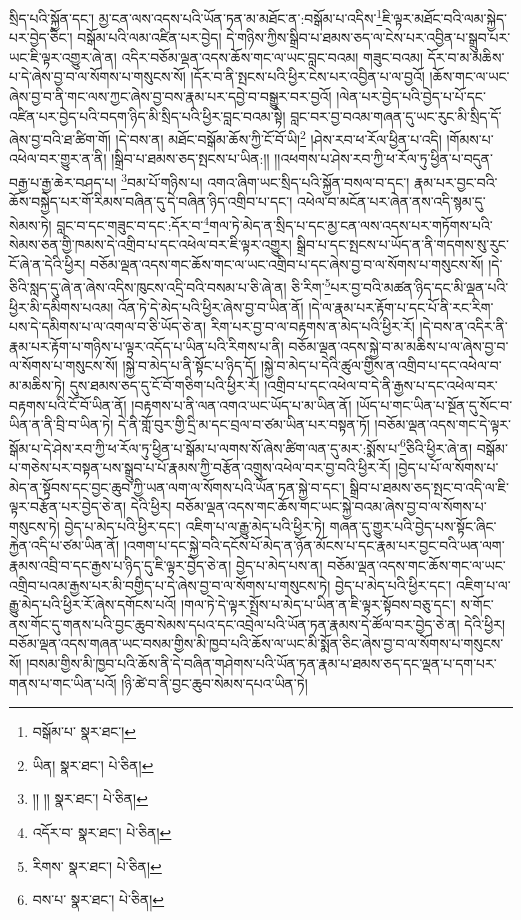 སྲིད་པའི་སྐྱོན་དང་། མྱ་ངན་ལས་འདས་པའི་ཡོན་ཏན་མ་མཐོང་ན་:བསྒོམ་པ་འདིས་\footnote{བསྒོམ་པ་  སྣར་ཐང་། }ཇི་ལྟར་མཐོང་བའི་ལམ་སྐྱེད་པར་བྱེད་ཅིང་། བསྒོམ་པའི་ལམ་འཛིན་པར་བྱེད། དེ་གཉིས་ཀྱིས་སྒྲིབ་པ་ཐམས་ཅད་ལ་ངེས་པར་འབྱིན་པ་སྒྲུབ་པར་ཡང་ཇི་ལྟར་འགྱུར་ཞེ་ན། འདིར་བཅོམ་ལྡན་འདས་ཆོས་གང་ལ་ཡང་བླང་བའམ། གཟུང་བའམ། དོར་བ་མ་མཆིས་པ་དེ་ཞེས་བྱ་བ་ལ་སོགས་པ་གསུངས་སོ། །དོར་བ་ནི་སྤངས་པའི་ཕྱིར་ངེས་པར་འབྱིན་པ་ལ་བྱའོ། །ཆོས་གང་ལ་ཡང་ཞེས་བྱ་བ་ནི་གང་ལས་ཀྱང་ཞེས་བྱ་བས་རྣམ་པར་དབྱེ་བ་བསྒྱུར་བར་བྱའོ། །ལེན་པར་བྱེད་པའི་བྱེད་པ་པོ་དང་འཛིན་པར་བྱེད་པའི་བདག་ཉིད་མི་སྲིད་པའི་ཕྱིར་བླང་བའམ་སྟེ། བླང་བར་བྱ་བའམ་གཞན་དུ་ཡང་རུང་མི་སྲིད་དོ་ཞེས་བྱ་བའི་ཐ་ཚིག་གོ། །དེ་བས་ན། མཐོང་བསྒོམ་ཆོས་ཀྱི་ངོ་བོ་ཡི།\footnote{ཡིན།  སྣར་ཐང་།  པེ་ཅིན། } །ཤེས་རབ་ཕ་རོལ་ཕྱིན་པ་འདི། །གོམས་པ་འཕེལ་བར་གྱུར་ན་ནི། །སྒྲིབ་པ་ཐམས་ཅད་སྤངས་པ་ཡིན:།། །།འཕགས་པ་ཤེས་རབ་ཀྱི་ཕ་རོལ་ཏུ་ཕྱིན་པ་བདུན་བརྒྱ་པ་རྒྱ་ཆེར་བཤད་པ། \footnote{།། །།   སྣར་ཐང་།  པེ་ཅིན། }བམ་པོ་གཉིས་པ། འགའ་ཞིག་ཡང་སྲིད་པའི་སྐྱོན་བསལ་བ་དང་། རྣམ་པར་བྱང་བའི་ཆོས་བསྐྱེད་པར་གོ་རིམས་བཞིན་དུ་དེ་བཞིན་ཉིད་འགྲིབ་པ་དང་། འཕེལ་བ་མངོན་པར་ཞེན་ནས་འདི་སྙམ་དུ་སེམས་ཏེ། བླང་བ་དང་གཟུང་བ་དང་:དོར་བ་\footnote{འདོར་བ་  སྣར་ཐང་།  པེ་ཅིན། }གལ་ཏེ་མེད་ན་སྲིད་པ་དང་མྱ་ངན་ལས་འདས་པར་གཏོགས་པའི་སེམས་ཅན་གྱི་ཁམས་དེ་འགྲིབ་པ་དང་འཕེལ་བར་ཇི་ལྟར་འགྱུར། སྒྲིབ་པ་དང་སྤངས་པ་ཡོད་ན་ནི་གདགས་སུ་རུང་ངོ་ཞེ་ན་དེའི་ཕྱིར། བཅོམ་ལྡན་འདས་གང་ཆོས་གང་ལ་ཡང་འགྲིབ་པ་དང་ཞེས་བྱ་བ་ལ་སོགས་པ་གསུངས་སོ། །དེ་ཅིའི་སླད་དུ་ཞེ་ན་ཞེས་འདིས་ཁུངས་འདྲི་བའི་བསམ་པ་ཅི་ཞེ་ན། ཅི་རིག་\footnote{རིགས་  སྣར་ཐང་།  པེ་ཅིན། }པར་བྱ་བའི་མཚན་ཉིད་དང་མི་ལྡན་པའི་ཕྱིར་མི་དམིགས་པའམ། འོན་ཏེ་དེ་མེད་པའི་ཕྱིར་ཞེས་བྱ་བ་ཡིན་ནོ། །དེ་ལ་རྣམ་པར་རྟོག་པ་དང་པོ་ནི་རང་རིག་པས་དེ་དམིགས་པ་ལ་འགལ་བ་ཅི་ཡོད་ཅེ་ན། རིག་པར་བྱ་བ་ལ་བརྟགས་ན་མེད་པའི་ཕྱིར་རོ། །དེ་བས་ན་འདིར་ནི་རྣམ་པར་རྟོག་པ་གཉིས་པ་ལྟར་འདོད་པ་ཡིན་པའི་རིགས་པ་ནི། བཅོམ་ལྡན་འདས་སྐྱེ་བ་མ་མཆིས་པ་ལ་ཞེས་བྱ་བ་ལ་སོགས་པ་གསུངས་སོ། །སྐྱེ་བ་མེད་པ་ནི་སྟོང་པ་ཉིད་དོ། །སྐྱེ་བ་མེད་པ་དེའི་ཚུལ་གྱིས་ན་འགྲིབ་པ་དང་འཕེལ་བ་མ་མཆིས་ཏེ། དུས་ཐམས་ཅད་དུ་ངོ་བོ་གཅིག་པའི་ཕྱིར་རོ། །འགྲིབ་པ་དང་འཕེལ་བ་དེ་ནི་རྒྱས་པ་དང་འཕེལ་བར་བརྟགས་པའི་ངོ་བོ་ཡིན་ནོ། །བརྟགས་པ་ནི་ལན་འགའ་ཡང་ཡོད་པ་མ་ཡིན་ནོ། །ཡོད་པ་གང་ཡིན་པ་སྔོན་དུ་སོང་བ་ཡིན་ན་ནི་བྲི་བ་ཡིན་ཏེ། དེ་ནི་གློ་བུར་གྱི་དྲི་མ་དང་བྲལ་བ་ཙམ་ཡིན་པར་བསྟན་ཏོ། །བཅོམ་ལྡན་འདས་གང་དེ་ལྟར་སྒོམ་པ་དེ་ཤེས་རབ་ཀྱི་ཕ་རོལ་ཏུ་ཕྱིན་པ་སྒོམ་པ་ལགས་སོ་ཞེས་ཚིག་ལན་དུ་མར་:སྨོས་པ་\footnote{བས་པ་  སྣར་ཐང་།  པེ་ཅིན། }ཅིའི་ཕྱིར་ཞེ་ན། བསྒོམ་པ་གཅེས་པར་བསྟན་པས་སྒྲུབ་པ་པོ་རྣམས་ཀྱི་བརྩོན་འགྲུས་འཕེལ་བར་བྱ་བའི་ཕྱིར་རོ། །བྱེད་པ་པོ་ལ་སོགས་པ་མེད་ན་སྟོབས་དང་བྱང་ཆུབ་ཀྱི་ཡན་ལག་ལ་སོགས་པའི་ཡོན་ཏན་སྐྱེ་བ་དང་། སྒྲིབ་པ་ཐམས་ཅད་སྤང་བ་འདི་ལ་ཇི་ལྟར་བརྩོན་པར་བྱེད་ཅེ་ན། དེའི་ཕྱིར། བཅོམ་ལྡན་འདས་གང་ཆོས་གང་ཡང་སྐྱེ་བའམ་ཞེས་བྱ་བ་ལ་སོགས་པ་གསུངས་ཏེ། བྱེད་པ་མེད་པའི་ཕྱིར་དང་། འཇིག་པ་ལ་རྒྱུ་མེད་པའི་ཕྱིར་ཏེ། གཞན་དུ་གྱུར་པའི་བྱེད་པས་སྟོང་ཞིང་རྐྱེན་འདི་པ་ཙམ་ཡིན་ནོ། །འགག་པ་དང་སྐྱེ་བའི་དངོས་པོ་མེད་ན་ཉོན་མོངས་པ་དང་རྣམ་པར་བྱང་བའི་ཡན་ལག་རྣམས་འབྲི་བ་དང་རྒྱས་པ་ཉིད་དུ་ཇི་ལྟར་བྱེད་ཅེ་ན། བྱེད་པ་མེད་པས་ན། བཅོམ་ལྡན་འདས་གང་ཆོས་གང་ལ་ཡང་འགྲིབ་པའམ་རྒྱས་པར་མི་བགྱིད་པ་དེ་ཞེས་བྱ་བ་ལ་སོགས་པ་གསུངས་ཏེ། བྱེད་པ་མེད་པའི་ཕྱིར་དང་། འཇིག་པ་ལ་རྒྱུ་མེད་པའི་ཕྱིར་རོ་ཞེས་དགོངས་པའོ། །གལ་ཏེ་དེ་ལྟར་སྤྲོས་པ་མེད་པ་ཡིན་ན་ཇི་ལྟར་སྟོབས་བཅུ་དང་། ས་གོང་ནས་གོང་དུ་གནས་པའི་བྱང་ཆུབ་སེམས་དཔའ་དང་འབྲེལ་པའི་ཡོན་ཏན་རྣམས་དེ་ཚོལ་བར་བྱེད་ཅེ་ན། དེའི་ཕྱིར། བཅོམ་ལྡན་འདས་གཞན་ཡང་བསམ་གྱིས་མི་ཁྱབ་པའི་ཆོས་ལ་ཡང་མི་སྨོན་ཅིང་ཞེས་བྱ་བ་ལ་སོགས་པ་གསུངས་སོ། །བསམ་གྱིས་མི་ཁྱབ་པའི་ཆོས་ནི་དེ་བཞིན་གཤེགས་པའི་ཡོན་ཏན་རྣམ་པ་ཐམས་ཅད་དང་ལྡན་པ་དག་པར་གནས་པ་གང་ཡིན་པའོ། །ཉི་ཚེ་བ་ནི་བྱང་ཆུབ་སེམས་དཔའ་ཡིན་ཏེ། 